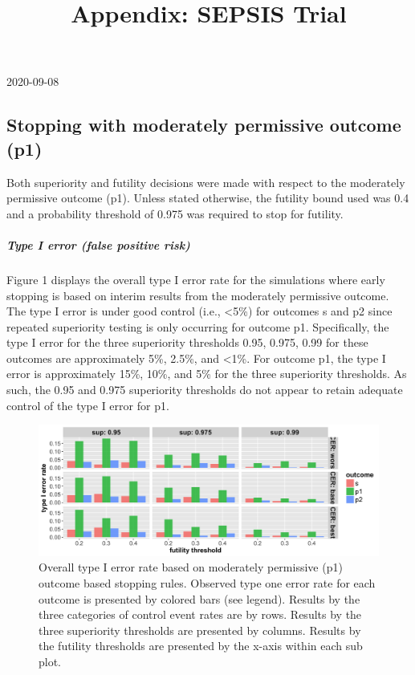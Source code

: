 \documentclass[]{article}
\title{Appendix: SEPSIS Trial}
\author{}
\date{\vspace{-2.5em}}
\let\oldsubparagraph\subparagraph
\renewcommand{\subparagraph}[1]{\oldsubparagraph{#1}\mbox{}}
\begin{document}
\maketitle

2020-09-08

\hypertarget{stopping-with-moderately-permissive-outcome-p1}{%
\subsection{Stopping with moderately permissive outcome
(p1)}\label{stopping-with-moderately-permissive-outcome-p1}}

Both superiority and futility decisions were made with respect to the
moderately permissive outcome (p1). Unless stated otherwise, the
futility bound used was 0.4 and a probability threshold of 0.975 was
required to stop for futility.

\hypertarget{type-i-error-false-positive-risk}{%
\subparagraph{Type I error (false positive
risk)}\label{type-i-error-false-positive-risk}}

Figure 1 displays the overall type I error rate for the simulations
where early stopping is based on interim results from the moderately
permissive outcome. The type I error is under good control (i.e.,
\textless{}5\%) for outcomes s and p2 since repeated superiority testing
is only occurring for outcome p1. Specifically, the type I error for the
three superiority thresholds 0.95, 0.975, 0.99 for these outcomes are
approximately 5\%, 2.5\%, and \textless{}1\%. For outcome p1, the type I
error is approximately 15\%, 10\%, and 5\% for the three superiority
thresholds. As such, the 0.95 and 0.975 superiority thresholds do not
appear to retain adequate control of the type I error for p1.

\captionsetup[figure]{font=small,labelfont=small}

\begin{figure}
  \caption{Overall type I error rate based on moderately permissive (p1) outcome based stopping rules. Observed type one
  error rate for each outcome is presented by colored bars (see legend). Results by the three categories of control
  event rates are by rows. Results by the three superiority thresholds are presented by columns. Results by the futility
  thresholds are presented by the x-axis within each sub plot.}
  \includegraphics{../plots/stop_p1_new/alpha_sim_05_stopp1_new.png}
\end{figure}
\end{document}

